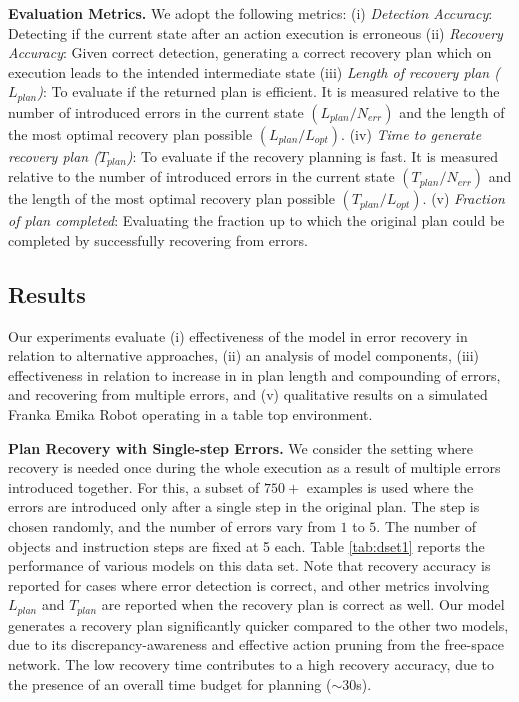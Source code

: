 \textbf{Evaluation Metrics. } We adopt the following metrics: (i) \textit{Detection Accuracy}: Detecting if the current state after an action execution is erroneous  (ii) \textit{Recovery Accuracy}: Given correct detection, generating a correct recovery plan which on execution leads to the intended intermediate state (iii) \textit{Length of recovery plan ($L_{plan}$)}: To evaluate if the returned plan is efficient. It is measured relative to the number of introduced errors in the current state $(L_{plan}/N_{err})$ and the length of the most optimal recovery plan possible $(L_{plan}/L_{opt})$. (iv) \textit{Time to generate recovery plan ($T_{plan}$)}: To evaluate if the recovery planning is fast. It is measured relative to the number of introduced errors in the current state $(T_{plan}/N_{err})$ and the length of the most optimal recovery plan possible $(T_{plan}/L_{opt})$. (v) \textit{Fraction of plan completed}: Evaluating the fraction up to which the original plan could be completed by successfully recovering from errors.

\subsection{Results}\label{sec:results}
Our experiments evaluate (i) effectiveness of the model in error recovery in relation to alternative approaches, (ii) an analysis of model components, (iii) effectiveness in relation to increase in in plan length and compounding of errors, and recovering from multiple errors, 
and (v) qualitative results on a simulated Franka Emika Robot operating in a table top environment. 

\textbf{Plan Recovery with Single-step Errors.} 
We consider the setting where recovery is needed once during the whole execution as a result of multiple errors introduced together. For this, a subset of $750+$ examples is used where the errors are introduced only after a single step in the original plan. The step is chosen randomly, and the number of errors vary from $1$ to $5$. The number of objects and instruction steps are fixed at 5 each. Table \ref{tab:dset1} reports the performance of various models on this data set. Note that recovery accuracy is reported for cases where error detection is correct, and other metrics involving $L_{plan}$ and $T_{plan}$ are reported when the recovery plan is correct as well. Our model generates a recovery plan significantly quicker compared to the other two models, due to its discrepancy-awareness and effective action pruning from the free-space network. The low recovery time contributes to a high recovery accuracy, due to the presence of an overall time budget for planning ($\sim$30s).

